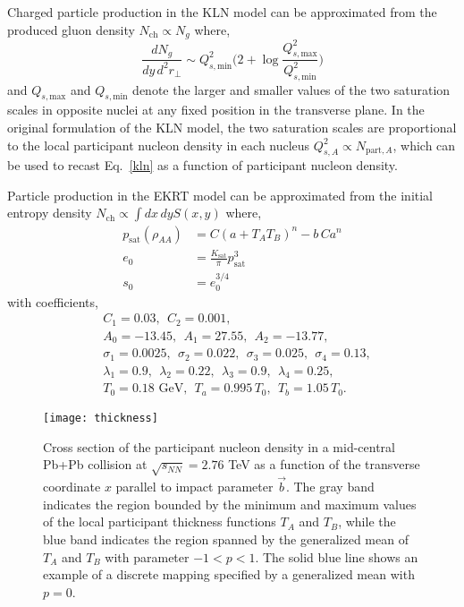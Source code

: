 \documentclass[aps,prc,reprint,amsmath,nofootinbib]{revtex4-1}
\newcommand{\nch}{N_\text{ch}}
\newcommand{\sqrts}{\sqrt{s_{NN}}}
\newcommand{\Qmin}{Q_{s,\text{min}}}
\newcommand{\Qmax}{Q_{s,\text{max}}}
\begin{document}
Charged particle production in the KLN model can be approximated from the produced gluon density $\nch \propto N_g$ where,
\begin{equation}
    \label{kln}
    \frac{dN_g}{dy\,d^2r_\perp} \sim \Qmin^2 \biggl( 2 + \log \frac{\Qmax^2}{\Qmin^2} \biggr)
\end{equation}
and $\Qmax$ and $\Qmin$ denote the larger and smaller values of the two saturation scales in opposite nuclei at any fixed position in the transverse plane.
In the original formulation of the KLN model, the two saturation scales are proportional to the local participant nucleon density in each nucleus $Q^2_{s,A} \propto N_{\text{part},A}$, which can be used to recast Eq.~\eqref{kln} as a function of participant nucleon density.

Particle production in the EKRT model can be approximated from the initial entropy density ${\nch \propto \int dx\,dy S(x,y)}$ where,
\begin{align}
    p_\text{sat}(\rho_{AA}) &= C(a + T_A T_B)^n - b\,C a^n \\
    e_0 &= \frac{K_\text{sat}}{\pi} p_\text{sat}^3 \\
    s_0 &= e_0^{3/4} 
\end{align}
with coefficients,
\begin{align*}
    &C_1=0.03, ~~C_2=0.001, \\ 
    &A_0=-13.45, ~~A_1=27.55, ~~A_2=-13.77, \\
    &\sigma_1=0.0025, ~~\sigma_2=0.022, ~~\sigma_3=0.025, ~~\sigma_4=0.13, \\
    &\lambda_1=0.9, ~~\lambda_2=0.22, ~~\lambda_3=0.9, ~~\lambda_4=0.25, \\
    &T_0 = 0.18 \text{ GeV}, ~~T_a = 0.995\, T_0, ~~T_b = 1.05\, T_0.
\end{align*}

\vfill

\begin{figure}[b]
    \texttt{[image: thickness]}
    \caption{Cross section of the participant nucleon density in a mid-central Pb+Pb collision at $\sqrts=2.76$ TeV as a function of the transverse coordinate $x$ parallel to impact parameter $\vec{b}$. The gray band indicates the region bounded by the minimum and maximum values of the local participant thickness functions $T_A$ and $T_B$, while the blue band indicates the region spanned by the generalized mean of $T_A$ and $T_B$ with parameter $-1<p<1$. The solid blue line shows an example of a discrete mapping specified by a generalized mean with $p=0$.} 
    \label{fig:thickness}
\end{figure}
\end{document}
